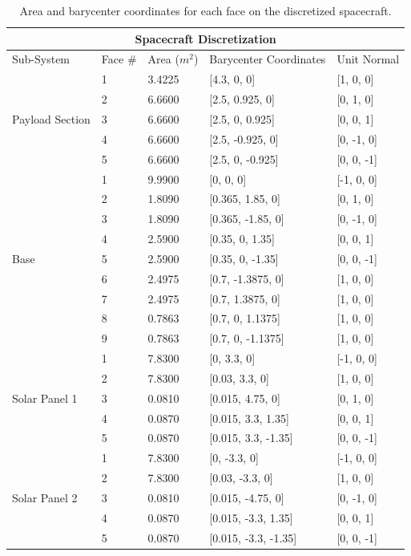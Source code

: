 \documentclass[12pt,a4paper,notitlepage]{article}
\begin{document}
\begin{table}[H]
\begin{center}
\begin{tabular}{ |p{1.5cm}||p{1.5cm}|p{2cm}|p{4cm}|p{3cm}|}
 \hline
 \multicolumn{5}{|c|}{\textbf{Spacecraft Discretization}} \\
 \hline
 Sub-System& Face \#&Area ($m^2$)&Barycenter Coordinates&Unit Normal\\
\hline
\multirow{5}{2em}{Payload Section} & 1 & 3.4225 & [4.3, 0, 0]&[1, 0, 0]\\ 
& 2 & 6.6600 & [2.5, 0.925, 0]&[0, 1, 0] \\ 
& 3 & 6.6600 & [2.5, 0, 0.925] &[0, 0, 1]\\ 
& 4 & 6.6600 & [2.5, -0.925, 0] &[0, -1, 0]\\
& 5 & 6.6600 & [2.5, 0, -0.925] &[0, 0, -1]\\
\hline
\multirow{9}{2em}{Base} & 1 & 9.9900 & [0, 0, 0]&[-1, 0, 0]\\ 
& 2 & 1.8090 & [0.365, 1.85, 0] &[0, 1, 0]\\ 
& 3 & 1.8090 & [0.365, -1.85, 0] &[0, -1, 0]\\ 
& 4 & 2.5900 & [0.35, 0, 1.35] &[0, 0, 1]\\
& 5 & 2.5900 & [0.35, 0, -1.35] &[0, 0, -1]\\
& 6 & 2.4975 & [0.7, -1.3875, 0]&[1, 0, 0] \\
& 7 & 2.4975 & [0.7, 1.3875, 0] &[1, 0, 0]\\
& 8 & 0.7863 & [0.7, 0, 1.1375] &[1, 0, 0]\\
& 9 & 0.7863 & [0.7, 0, -1.1375] &[1, 0, 0]\\
\hline
\multirow{5}{2em}{Solar Panel 1} & 1 & 7.8300 & [0, 3.3, 0]&[-1, 0, 0]\\ 
& 2 & 7.8300 & [0.03, 3.3, 0] &[1, 0, 0]\\ 
& 3 & 0.0810 & [0.015, 4.75, 0]&[0, 1, 0] \\ 
& 4 & 0.0870 & [0.015, 3.3, 1.35]&[0, 0, 1] \\
& 5 & 0.0870 & [0.015, 3.3, -1.35]&[0, 0, -1] \\
\hline
\multirow{5}{2em}{Solar Panel 2} & 1 & 7.8300 & [0, -3.3, 0]&[-1, 0, 0]\\ 
& 2 & 7.8300 & [0.03, -3.3, 0]&[1, 0, 0] \\ 
& 3 & 0.0810 & [0.015, -4.75, 0] &[0, -1, 0]\\ 
& 4 & 0.0870 & [0.015, -3.3, 1.35] &[0, 0, 1]\\
& 5 & 0.0870 & [0.015, -3.3, -1.35] &[0, 0, -1]\\
\hline
\end{tabular}
\caption{Area and barycenter coordinates for each face on the discretized spacecraft.}
\label{table:discrete}
\end{center}
\end{table}
\end{document}
